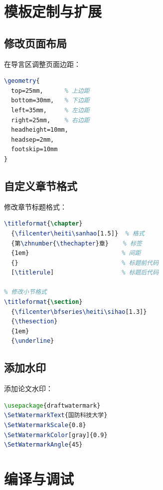 \section{模板定制与扩展}
\label{sec:customization}

\subsection{修改页面布局}
在导言区调整页面边距：

\begin{lstlisting}[language=TeX]
% 调整页边距
\geometry{
  top=25mm,      % 上边距
  bottom=30mm,   % 下边距
  left=35mm,     % 左边距
  right=25mm,    % 右边距
  headheight=10mm,
  headsep=2mm,
  footskip=10mm
}
\end{lstlisting}

\subsection{自定义章节格式}
修改章节标题格式：

\begin{lstlisting}[language=TeX]
% 修改章节格式
\titleformat{\chapter}
  {\filcenter\heiti\sanhao[1.5]}  % 格式
  {第\zhnumber{\thechapter}章}    % 标签
  {1em}                          % 间距
  {}                             % 标题前代码
  [\titlerule]                   % 标题后代码
  
% 修改小节格式
\titleformat{\section}
  {\filcenter\bfseries\heiti\sihao[1.3]}
  {\thesection}
  {1em}
  {\underline}
\end{lstlisting}

\subsection{添加水印}
添加论文水印：

\begin{lstlisting}[language=TeX]
% 需要添加包
\usepackage{draftwatermark}
\SetWatermarkText{国防科技大学}
\SetWatermarkScale{0.8}
\SetWatermarkColor[gray]{0.9}
\SetWatermarkAngle{45}
\end{lstlisting}

\section{编译与调试}
\label{sec:compilation}

